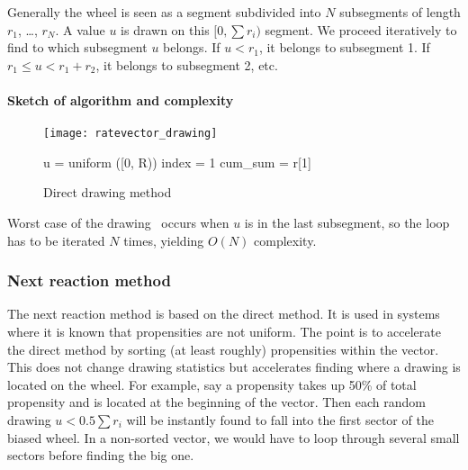 Generally the wheel is seen as a segment subdivided into $N$ subsegments of length $r_1$, \ldots{}, $r_N$.
A value $u$ is drawn on this $[0, \sum r_i)$ segment.
We proceed iteratively to find to which subsegment $u$ belongs.
If $u < r_1$, it belongs to subsegment 1.
If $r_1 \leq u < r_1+r_2$, it belongs to subsegment 2, etc.


\paragraph{Sketch of algorithm and complexity}
\begin{figure}[!h]
  \begin{minipage}{0.5\textwidth}
    \texttt{[image: ratevector\_drawing]}
  \end{minipage}
  \begin{minipage}{0.5\textwidth}
    \begin{algorithm}[H]
      u = uniform ([0, R))\;
        index = 1\;
        cum\_sum = r[1]\;
    \end{algorithm}
  \end{minipage}
  \caption{Direct drawing method}
\label{fig:direct_drawing}
\end{figure}
Worst case of the drawing~ occurs when $u$ is in the last subsegment,
so the loop has to be iterated $N$ times, yielding $O(N)$ complexity.


\subsubsection{Next reaction method}

The next reaction method is based on the direct method.
It is used in systems where it is known that propensities are not uniform.
The point is to accelerate the direct method by sorting (at least roughly) propensities within the vector.
This does not change drawing statistics but accelerates finding where a drawing is located on the wheel.
For example, say a propensity takes up 50\% of total propensity and is located at the beginning of the vector.
Then each random drawing $u < 0.5\sum r_i$ will be instantly found to fall into the first sector of the biased wheel.
In a non-sorted vector, we would have to loop through several small sectors before finding the big one.

